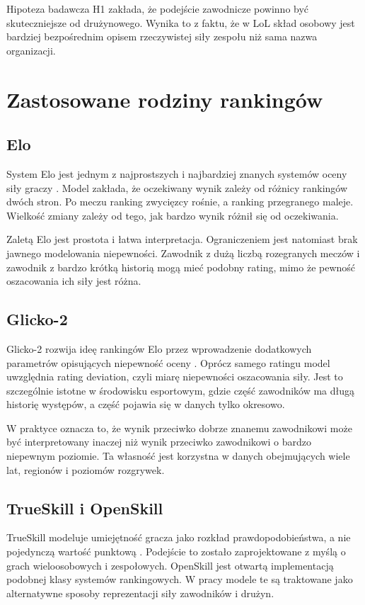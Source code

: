 Hipoteza badawcza H1 zakłada, że podejście zawodnicze powinno być skuteczniejsze od drużynowego.
Wynika to z faktu, że w LoL skład osobowy jest bardziej bezpośrednim opisem rzeczywistej siły
zespołu niż sama nazwa organizacji.

\section{Zastosowane rodziny rankingów}

\subsection{Elo}

System Elo jest jednym z najprostszych i najbardziej znanych systemów oceny siły graczy
\parencite{elo1978}. Model zakłada, że oczekiwany wynik zależy od różnicy rankingów dwóch stron. Po
meczu ranking zwycięzcy rośnie, a ranking przegranego maleje. Wielkość zmiany zależy od tego, jak
bardzo wynik różnił się od oczekiwania.

Zaletą Elo jest prostota i łatwa interpretacja. Ograniczeniem jest natomiast brak jawnego
modelowania niepewności. Zawodnik z dużą liczbą rozegranych meczów i zawodnik z bardzo krótką
historią mogą mieć podobny rating, mimo że pewność oszacowania ich siły jest różna.

\subsection{Glicko-2}

Glicko-2 rozwija ideę rankingów Elo przez wprowadzenie dodatkowych parametrów opisujących niepewność
oceny \parencite{glickman2012}. Oprócz samego ratingu model uwzględnia rating deviation, czyli miarę
niepewności oszacowania siły. Jest to szczególnie istotne w środowisku esportowym, gdzie część
zawodników ma długą historię występów, a część pojawia się w danych tylko okresowo.

W praktyce oznacza to, że wynik przeciwko dobrze znanemu zawodnikowi może być interpretowany inaczej
niż wynik przeciwko zawodnikowi o bardzo niepewnym poziomie. Ta własność jest korzystna w danych
obejmujących wiele lat, regionów i poziomów rozgrywek.

\subsection{TrueSkill i OpenSkill}

TrueSkill modeluje umiejętność gracza jako rozkład prawdopodobieństwa, a nie pojedynczą wartość
punktową \parencite{trueskill2007}. Podejście to zostało zaprojektowane z myślą o grach
wieloosobowych i zespołowych. OpenSkill jest otwartą implementacją podobnej klasy systemów
rankingowych. W pracy modele te są traktowane jako alternatywne sposoby reprezentacji siły
zawodników i drużyn.

